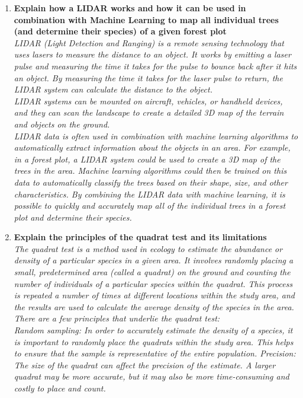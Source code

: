 \documentclass{article}
\begin{document}
\begin{enumerate}
    \item \textbf{Explain how a LIDAR works and how it can be used in combination with Machine Learning to map all individual trees (and determine their species) of a given forest plot} \\
    \textit{LIDAR (Light Detection and Ranging) is a remote sensing technology that uses lasers to measure the distance to an object. It works by emitting a laser pulse and measuring the time it takes for the pulse to bounce back after it hits an object. By measuring the time it takes for the laser pulse to return, the LIDAR system can calculate the distance to the object.\\
    LIDAR systems can be mounted on aircraft, vehicles, or handheld devices, and they can scan the landscape to create a detailed 3D map of the terrain and objects on the ground.\\
    LIDAR data is often used in combination with machine learning algorithms to automatically extract information about the objects in an area. For example, in a forest plot, a LIDAR system could be used to create a 3D map of the trees in the area. Machine learning algorithms could then be trained on this data to automatically classify the trees based on their shape, size, and other characteristics. By combining the LIDAR data with machine learning, it is possible to quickly and accurately map all of the individual trees in a forest plot and determine their species.}
    \item \textbf{Explain the principles of the quadrat test and its limitations} \\
    \textit{The quadrat test is a method used in ecology to estimate the abundance or density of a particular species in a given area. It involves randomly placing a small, predetermined area (called a quadrat) on the ground and counting the number of individuals of a particular species within the quadrat. This process is repeated a number of times at different locations within the study area, and the results are used to calculate the average density of the species in the area.\\
    There are a few principles that underlie the quadrat test:\\
    Random sampling: In order to accurately estimate the density of a species, it is important to randomly place the quadrats within the study area. This helps to ensure that the sample is representative of the entire population.
    Precision: The size of the quadrat can affect the precision of the estimate. A larger quadrat may be more accurate, but it may also be more time-consuming and costly to place and count.
}
\end{enumerate}
\end{document}
